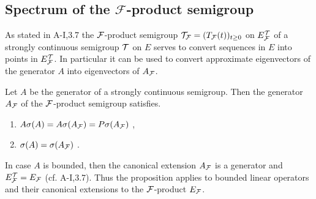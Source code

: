 \subsection{Spectrum of the 
\texorpdfstring{$\mathcal{F}$-product}{F-product} semigroup}\label{subsec:a3-4.5}%
As stated in A-I,3.7 the $\mathcal{F}$-product semigroup $\mathcal{T}_{\mathcal{F}} = (T_{\mathcal{F}}(t))_{t \geq 0}$ on $E_{\mathcal{F}}^{\mathcal{T}}$ of a strongly continuous semigroup $\mathcal{T}$ on $E$ serves to convert sequences in $E$ into points in $E_{\mathcal{F}}^{\mathcal{T}}$.
In particular it can be used to convert approximate eigenvectors of the generator $A$ into eigenvectors of $A_{\mathcal{F}}$.
\begin{proposition}\label{prop:a3-4.4}
Let $A$ be the generator of a strongly continuous semigroup. Then the generator $A_{\mathcal{F}}$ of the $\mathcal{F}$-product semigroup satisfies.
\begin{enumerate}[\upshape (i)]
\item 
	$A\sigma(A) = A\sigma(A_{\mathcal{F}}) = P\sigma(A_{\mathcal{F}})$ ,

\item 
	$\sigma(A) = \sigma(A_{\mathcal{F}})$ .
\end{enumerate}
\end{proposition}
\begin{remark}
In case $A$ is bounded, then the canonical extension $A_{\mathcal{F}}$ is a generator and $E_{\mathcal{F}}^{\mathcal{T}} = E_{\mathcal{F}}$ (cf. A-I,3.7).
Thus the proposition applies to bounded linear operators and their canonical extensions to the 
$\mathcal{F}$-product $E_{\mathcal{F}}$.
\end{remark}
